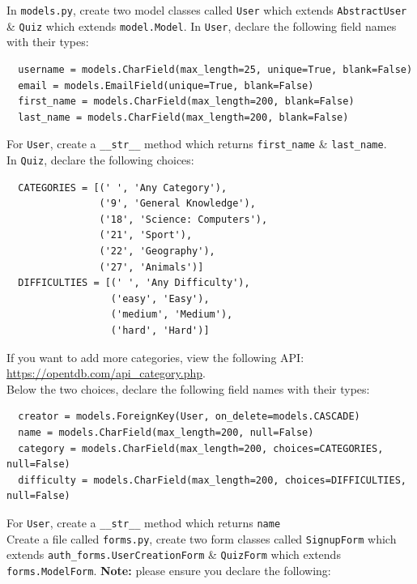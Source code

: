 \documentclass{article}
\begin{document}
In \texttt{models.py}, create two model classes called \texttt{User} which extends \texttt{AbstractUser} \& \texttt{Quiz} which extends \texttt{model.Model}. In \texttt{User}, declare the following field names with their types:
\begin{verbatim}
  username = models.CharField(max_length=25, unique=True, blank=False)
  email = models.EmailField(unique=True, blank=False)
  first_name = models.CharField(max_length=200, blank=False)
  last_name = models.CharField(max_length=200, blank=False)
\end{verbatim}

For \texttt{User}, create a \texttt{\_\_str\_\_} method which returns \texttt{first\_name} \& \texttt{last\_name}. \\

In \texttt{Quiz}, declare the following choices:
\begin{verbatim}
  CATEGORIES = [(' ', 'Any Category'),
                ('9', 'General Knowledge'),
                ('18', 'Science: Computers'),
                ('21', 'Sport'),
                ('22', 'Geography'),
                ('27', 'Animals')]
  DIFFICULTIES = [(' ', 'Any Difficulty'),
                  ('easy', 'Easy'),
                  ('medium', 'Medium'),
                  ('hard', 'Hard')]
\end{verbatim}

If you want to add more categories, view the following API: \href{https://opentdb.com/api\_category.php}{https://opentdb.com/api\_category.php}. \\

Below the two choices, declare the following field names with their types:

\begin{verbatim}
  creator = models.ForeignKey(User, on_delete=models.CASCADE)
  name = models.CharField(max_length=200, null=False)
  category = models.CharField(max_length=200, choices=CATEGORIES, null=False)
  difficulty = models.CharField(max_length=200, choices=DIFFICULTIES, null=False)
\end{verbatim}

For \texttt{User}, create a \texttt{\_\_str\_\_} method which returns \texttt{name} \\

Create a file called \texttt{forms.py}, create two form classes called \texttt{SignupForm} which extends \texttt{auth\_forms.UserCreationForm} \& \texttt{QuizForm} which extends \texttt{forms.ModelForm}. \textbf{Note:} please ensure you declare the following:
\end{document}
